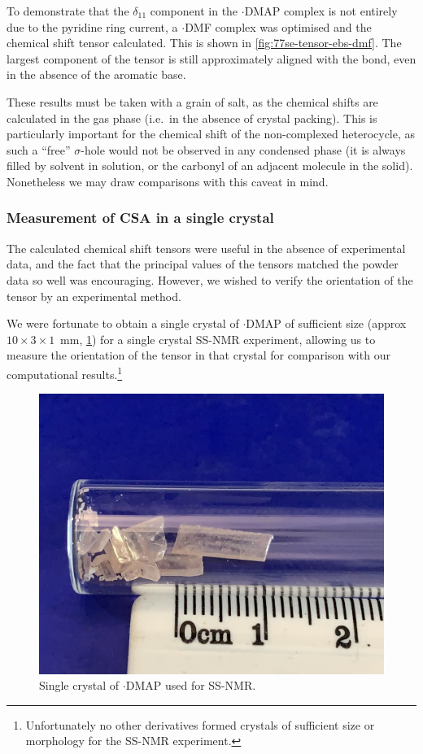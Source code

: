 \begin{refsection}
To demonstrate that the $\delta_{11}$ component in the $ \cdot $DMAP complex is not entirely due to the pyridine ring current, a $ \cdot $DMF complex was optimised and the chemical shift tensor calculated.
This is shown in \cref{fig:77se-tensor-ebs-dmf}.
The largest component of the tensor is still approximately aligned with the  bond, even in the absence of the aromatic base.

These results must be taken with a grain of salt, as the chemical shifts are calculated in the gas phase (i.e.\ in the absence of crystal packing).
This is particularly important for the chemical shift of the non-complexed heterocycle, as such a ``free'' $ \sigma $-hole would not be observed in any condensed phase (it is always filled by solvent in solution, or the carbonyl of an adjacent molecule in the solid).
Nonetheless we may draw comparisons with this caveat in mind.

\subsubsection{Measurement of CSA in a single crystal}
The calculated chemical shift tensors were useful in the absence of experimental data, and the fact that the principal values of the tensors matched the powder data so well was encouraging.
However, we wished to verify the orientation of the tensor by an experimental method.

We were fortunate to obtain a single crystal of $ \cdot $DMAP of sufficient size (approx $10\times3\times1$~mm, \cref{fig:ebs-ph-dmap-picture}) for a single crystal SS-NMR experiment, allowing us to measure the orientation of the tensor in that crystal for comparison with our computational results.\footnote{Unfortunately no other derivatives formed crystals of sufficient size or morphology for the SS-NMR experiment.}

\begin{figure}
  \centering
  \includegraphics[width=0.4\linewidth]{Figures/ebs-ph-dmap-picture.jpg}
  \caption{Single crystal of $ \cdot $DMAP used for SS-NMR.}\label{fig:ebs-ph-dmap-picture}
\end{figure}


\end{refsection}
